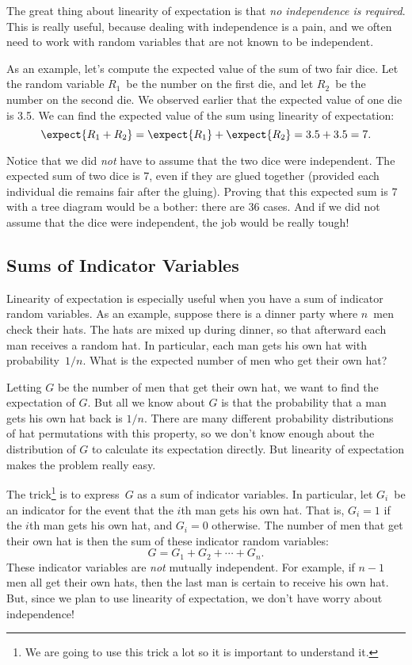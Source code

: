 The great thing about linearity of expectation is that \emph{no
independence is required}.  This is really useful, because dealing with
independence is a pain, and we often need to work with random variables
that are not known to be independent.

As an example, let's compute the expected value of the sum of two fair
dice.  Let the random variable $R_1$~be the number on the first die,
and let $R_2$~be the number on the second die.  We observed earlier
that the expected value of one die is 3.5.  We can find the expected
value of the sum using linearity of expectation:
\begin{equation*}
\expect{R_1 + R_2}
 =   \expect{R_1} + \expect{R_2}
 =    3.5 + 3.5
 =    7.
\end{equation*}

Notice that we did \emph{not} have to assume that the two dice were
independent.  The expected sum of two dice is 7, even if they are
glued together (provided each individual die remains fair after the
gluing).  Proving that this expected sum is 7 with a tree diagram
would be a bother: there are 36 cases.  And if we did not assume that
the dice were independent, the job would be really tough!

\subsection{Sums of Indicator Variables}

Linearity of expectation is especially useful when you have a sum of
indicator random variables.  As an example, suppose there is a dinner
party where $n$~men check their hats.  The hats are mixed up during
dinner, so that afterward each man receives a random hat.  In
particular, each man gets his own hat with probability~$1/n$.  What is
the expected number of men who get their own hat?

Letting $G$ be the number of men that get their own hat, we want to find
the expectation of $G$.  But all we know about $G$ is that the probability
that a man gets his own hat back is $1/n$.  There are many different
probability distributions of hat permutations with this property, so we
don't know enough about the distribution of $G$ to calculate its
expectation directly.  But linearity of expectation makes the problem
really easy.

The trick\footnote{We are going to use this trick a lot so it is
  important to understand it.} is to express~$G$ as a sum of indicator
variables.  In particular, let $G_i$~be an indicator for the event
that the $i$th man gets his own hat.  That is, $G_i = 1$ if the $i$th
man gets his own hat, and $G_i = 0$ otherwise.  The number of men that
get their own hat is then the sum of these indicator random variables:
\begin{equation}\label{GG}
    G = G_1 + G_2 + \cdots + G_n.
\end{equation}
These indicator variables are \emph{not} mutually independent.  For
example, if $n-1$ men all get their own hats, then the last man is
certain to receive his own hat.  But, since we plan to use linearity
of expectation, we don't have worry about independence!

